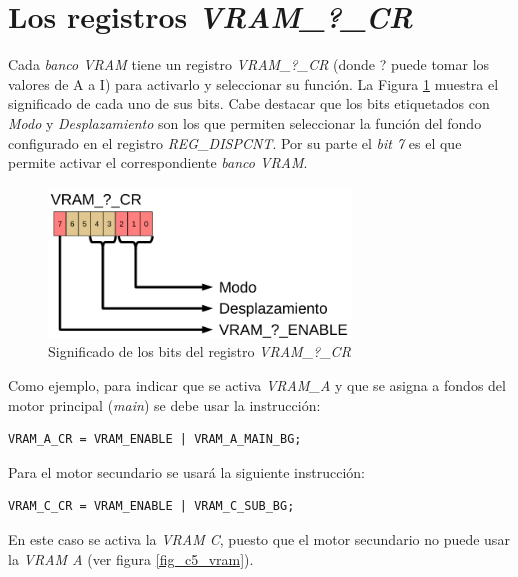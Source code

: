 \section{Los registros \textit{VRAM\_?\_CR}} 
Cada \textit{banco VRAM} tiene un registro \textit{VRAM\_?\_CR} (donde ? puede tomar los valores de A a I) para activarlo y seleccionar su función. La Figura \ref{fig_c5_reg_vram1} muestra el significado de cada uno de sus bits. Cabe destacar que los bits etiquetados con \textit{Modo} y \textit{Desplazamiento} son los que permiten seleccionar la función del fondo configurado en el registro \textit{REG\_DISPCNT}. Por su parte el \textit{bit 7} es el que permite activar el correspondiente \textit{banco VRAM}.

\begin{figure}[t]
\centering
\includegraphics[height=4cm]{Figuras/C5/c5_reg_vram1.png}
\caption{Significado de los bits del registro \textit{VRAM\_?\_CR}}
\label{fig_c5_reg_vram1}
\end{figure}

Como ejemplo, para indicar que se activa \textit{VRAM\_A} y que se asigna a fondos del motor principal (\textit{main}) se debe usar la instrucción:

\begin{verbatim}
VRAM_A_CR = VRAM_ENABLE | VRAM_A_MAIN_BG;
\end{verbatim}

Para el motor secundario se usará la siguiente instrucción:

\begin{verbatim}
VRAM_C_CR = VRAM_ENABLE | VRAM_C_SUB_BG;
\end{verbatim}

En este caso se activa la \textit{VRAM C}, puesto que el motor secundario no puede usar la \textit{VRAM A} (ver figura \ref{fig_c5_vram}).
